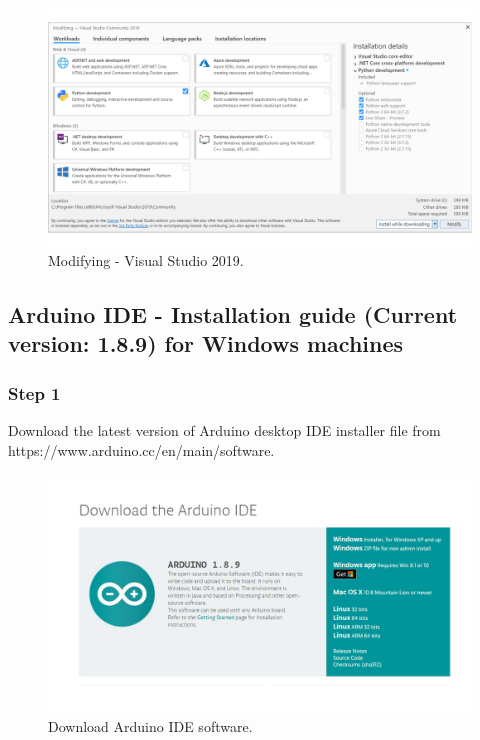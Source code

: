 \begin{refsection}
\begin{figure}[H]
	\centering
	\includegraphics[width=1\linewidth]{./sdf/arduino_quantum_rx/figures/VSworkloads.pdf}
	\caption{Modifying - Visual Studio 2019.}
	\label{vstudioWorkloads}
\end{figure}

\subsection{Arduino IDE - Installation guide (Current version: 1.8.9) for Windows machines}

\subsubsection{Step 1}

Download the latest version of Arduino desktop IDE installer file from https://www.arduino.cc/en/main/software.

\begin{figure}[H]
	\centering
	\includegraphics[width=0.86\linewidth]{./sdf/arduino_quantum_rx/figures/arduinoDownload.pdf}
	\caption{Download Arduino IDE software.}
	\label{arduinoDownload}
\end{figure}



\end{refsection}
